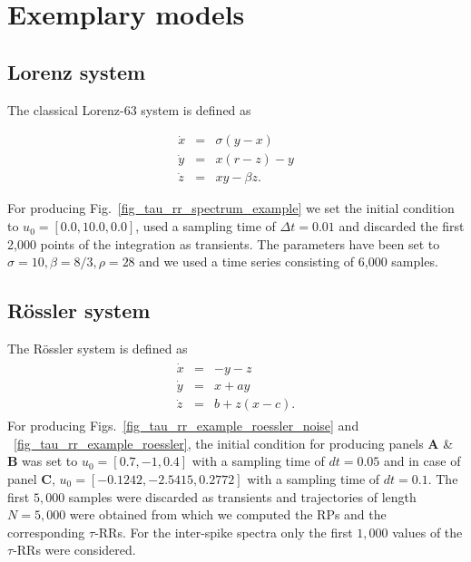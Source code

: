 \documentclass[entropy,article,submit,pdftex,moreauthors]{Definitions/mdpi}
\begin{document}
\appendixstart
\appendix

\section{Exemplary models}
 
\subsection{Lorenz system}\label{sec_models_lorenz63}

\noindent The classical Lorenz-63 system \cite{lorenz1963} is defined as

\begin{equation}
\begin{array}{rcl}
\dot{x}&=&\sigma(y-x) \\
\dot{y}&=&x(r-z)-y \\
\dot{z}&=&xy - \beta z.
\end{array}
\label{eq_model_Lorenz63}
\end{equation}

\noindent For producing Fig.~\ref{fig_tau_rr_spectrum_example} we set the initial condition to $u_0=[0.0, 10.0, 0.0]$, used a sampling time of $\Delta t=0.01$ and discarded the first 
2,000 points of the integration as transients. The parameters have been set to 
$\sigma=10, \beta=8/3, \rho=28$ and we used a time series consisting of 6,000 samples.

\subsection{R\"ossler system}\label{sec_models_roessler}

\noindent The R\"ossler system \cite{roessler1976} is defined as
\begin{align}
\begin{array}{rcl}
\dot{x}&=&-y-z \\
\dot{y}&=&x+ay \\
\dot{z}&=&b+ z(x-c) .
\end{array}
\label{eq_model_roessler}
\end{align}
For producing Figs.~\ref{fig_tau_rr_example_roessler_noise} and ~\ref{fig_tau_rr_example_roessler}, the initial condition for producing panels \textbf{A} \& \textbf{B} was set to $u_0=[0.7, -1, 0.4]$ with a sampling time 
of $dt=0.05$ and in case of panel \textbf{C}, $u_0=[-0.1242, -2.5415, 0.2772]$ with a sampling time of $dt=0.1$. The first $5,000$ samples were discarded as transients and trajectories of length $N=5,000$ were 
obtained from which we computed the RPs and the corresponding $\tau$-RRs. For the inter-spike spectra only the first $1,000$ values of the $\tau$-RRs were considered.
\end{document}
